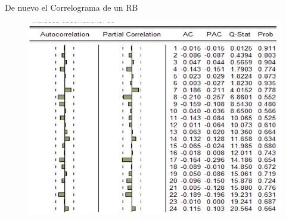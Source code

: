 \begin{frame}{De nuevo el Correlograma de un RB}
	\centering
	\begin{figure}
		\includegraphics[width = 0.75\linewidth]{fig/figure7.jpg}
	\end{figure}
\end{frame}